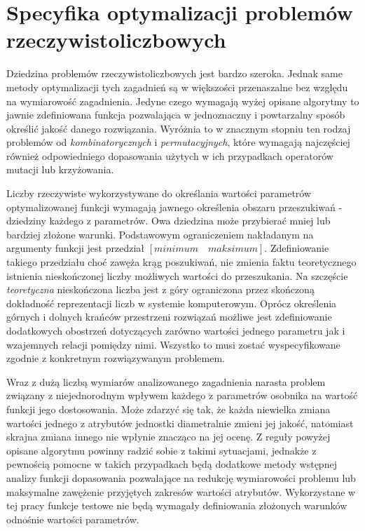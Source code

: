 \section{Specyfika optymalizacji problemów rzeczywistoliczbowych}
\label{sec:specyfika_optymalizacji_problemów_rzeczywistoliczbowych}
\par
Dziedzina problemów rzeczywistoliczbowych jest bardzo szeroka. Jednak same metody optymalizacji tych zagadnień są w większości przenaszalne bez względu na wymiarowość zagadnienia. Jedyne czego wymagają wyżej opisane algorytmy to jawnie zdefiniowana funkcja pozwalająca w jednoznaczny i powtarzalny sposób określić jakość danego rozwiązania. Wyróżnia to w znacznym stopniu ten rodzaj problemów od \emph{kombinatorycznych} i \emph{permutacyjnych}, które wymagają najczęściej również odpowiedniego dopasowania użytych w ich przypadkach operatorów mutacji lub krzyżowania.
\par
Liczby rzeczywiste wykorzystywane do określania wartości parametrów optymalizowanej funkcji wymagają jawnego określenia obszaru przeszukiwań - dziedziny każdego z parametrów. Owa dziedzina może przybierać mniej lub bardziej złożone warunki. Podstawowym ograniczeniem nakładanym na argumenty funkcji jest przedział $[minimum \quad maksimum]$. Zdefiniowanie takiego przedziału choć zawęża krąg poszukiwań, nie zmienia faktu teoretycznego istnienia nieskończonej liczby możliwych wartości do przeszukania. Na szczęście \emph{teoretyczna} nieskończona liczba jest z góry ograniczona przez skończoną dokładność reprezentacji liczb w systemie komputerowym. Oprócz określenia górnych i dolnych krańców przestrzeni rozwiązań możliwe jest zdefiniowanie dodatkowych obostrzeń dotyczących zarówno wartości jednego parametru jak i wzajemnych relacji pomiędzy nimi. Wszystko to musi zostać wyspecyfikowane zgodnie z konkretnym rozwiązywanym problemem.
\par
Wraz z dużą liczbą wymiarów analizowanego zagadnienia narasta problem związany z niejednorodnym wpływem każdego z parametrów osobnika na wartość funkcji jego dostosowania. Może zdarzyć się tak, że każda niewielka zmiana wartości jednego z atrybutów jednostki diametralnie zmieni jej jakość, natomiast skrajna zmiana innego nie wpłynie znacząco na jej ocenę. Z reguły powyżej opisane algorytmu powinny radzić sobie z takimi sytuacjami, jednakże z pewnością pomocne w takich przypadkach będą dodatkowe metody wstępnej analizy funkcji dopasowania pozwalające na redukcję wymiarowości problemu lub maksymalne zawężenie przyjętych zakresów wartości atrybutów. Wykorzystane w tej pracy funkcje testowe nie będą wymagały definiowania złożonych warunków odnośnie wartości parametrów. 


